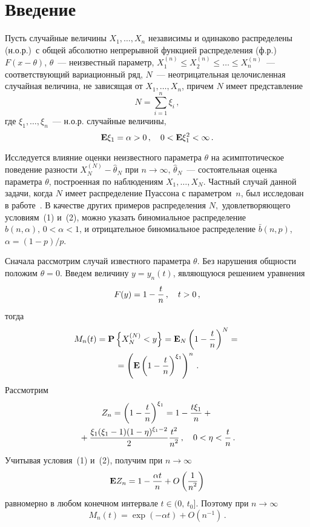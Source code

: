       \begin{multicols}{2}

      \label{st\stat}

\section{Введение}

Пусть случайные величины $X_1,\ldots,X_n$ независимы и одинаково
распределены (н.о.р.)\ с общей абсолютно непрерывной функцией
распределения (ф.р.) $F(x-\theta)$, $\theta$~--- неизвестный
параметр, $X_1^{(n)}\leq X_2^{(n)}\leq \ldots\leq X_n^{(n)}$~---
соответствующий вариационный ряд, $N$~--- неотрицательная
целочисленная случайная величина, не зависящая от $X_1,\ldots,X_n$,
причем $N$ имеет представление
\begin{equation}
N=\sum_{i=1}^{n}\xi_i\,,
\label{1}
\end{equation}
где $\xi_1,\ldots,\xi_n$~--- н.о.р. случайные величины,
\begin{equation}
{\bf E}\xi_1=\alpha>0\,, \quad 0<{\bf E}\xi_1^2<\infty\,.
\label{2}
\end{equation}

Исследуется влияние оценки неизвестного параметра $\theta$ на
асимптотическое поведение разности $X_N^{(N)}-\hat \theta_N $ при
$n \to\infty, \, \hat \theta_N$~--- состоятельная оценка параметра
$\theta$, построенная по наблюдениям $X_1,\ldots ,X_N$. Частный случай
данной задачи, когда $N$ имеет распределение Пуассона с параметром~$n$, 
был исследован в работе~\cite{1pag}. В качестве других примеров
распределения $N,$ удовлетворяющего условиям~(1) и~(2), можно
указать биномиальное распределение $b(n,\alpha), \, 0<\alpha<1$, и
отрицательное биномиальное распределение $\bar b(n,p)$,
$\alpha=(1-p)/p$.

Сначала рассмотрим случай известного па\-ра\-мет\-ра $\theta$. Без
нарушения общности положим $\theta=0$. Введем величину $y=y_n(t)$,
являющуюся решением уравнения
\begin{equation}
F(y)=1-\displaystyle\frac{\displaystyle t\mathstrut}{\displaystyle n\mathstrut}\,, \quad t>0\,,
\label{3}
\end{equation}
 тогда
 \begin{multline*}
M_n(t)={\bf P}\left\{X_N^{(N)}<y\right\}={\bf E}_N\left(1-\displaystyle\frac{\displaystyle t\mathstrut}{\displaystyle n\mathstrut}\right)^N={}\\
{}=\left({\bf E}
 \left(1-\displaystyle\frac{\displaystyle t\mathstrut}{\displaystyle n\mathstrut}\right)^{\xi_1}\right)^n\,.
\end{multline*}
Рассмотрим
 \begin{multline*}
Z_n=\left(1-\displaystyle\frac{\displaystyle t\mathstrut}{\displaystyle n\mathstrut}\right)^{\xi_1}=1-\displaystyle\frac{\displaystyle t\xi_1\mathstrut}{\displaystyle n\mathstrut}+{}\\
{}+
\displaystyle\frac{\displaystyle \xi_1(\xi_1-1)
 (1-\eta)^{\xi_1-2}\mathstrut}{\displaystyle 2\mathstrut}\displaystyle\frac{\displaystyle t^2\mathstrut}{\displaystyle n^2\mathstrut}\,, \quad 0<\eta<\displaystyle\frac{\displaystyle t\mathstrut}{\displaystyle n\mathstrut}\,.
\end{multline*}
 Учитывая условия~(1) и~(2), получим при $n \to \infty$
 $$
{\bf E}Z_n=1-\displaystyle\frac{\displaystyle \alpha t\mathstrut}{\displaystyle n\mathstrut}+O\left(\displaystyle\frac{\displaystyle 1\mathstrut}{\displaystyle n^2\mathstrut}\right)
$$
 равномерно в
 любом конечном интервале $t\in (0,\,t_0]$. Поэтому при $n \to
 \infty$
 $$
M_n(t)=\exp(-\alpha t)+O(n^{-1})\,.
$$


\end{multicols}
